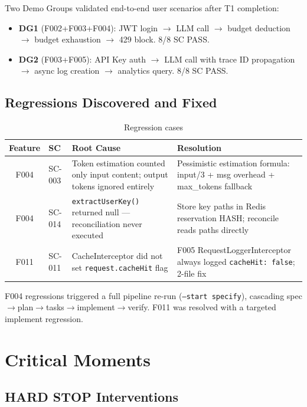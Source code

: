 \documentclass[11pt,a4paper,openright,twoside]{report}
\begin{document}
Two Demo Groups validated end-to-end user scenarios after T1 completion:

\begin{itemize}[nosep]
  \item \textbf{DG1} (F002+F003+F004): JWT login $\to$ LLM call $\to$ budget deduction $\to$ budget exhaustion $\to$ 429 block. 8/8 SC PASS.
  \item \textbf{DG2} (F003+F005): API Key auth $\to$ LLM call with trace ID propagation $\to$ async log creation $\to$ analytics query. 8/8 SC PASS.
\end{itemize}

\subsection{Regressions Discovered and Fixed}

\begin{table}[H]
\centering
\caption{Regression cases}
\label{tab:aegis-regressions}
\begin{tabularx}{\textwidth}{clXX}
\toprule
\textbf{Feature} & \textbf{SC} & \textbf{Root Cause} & \textbf{Resolution} \\
\midrule
F004 & SC-003 & Token estimation counted only input content; output tokens ignored entirely & Pessimistic estimation formula: input/3 + msg overhead + max\_tokens fallback \\
F004 & SC-014 & \texttt{extractUserKey()} returned null --- reconciliation never executed & Store key paths in Redis reservation HASH; reconcile reads paths directly \\
F011 & SC-011 & CacheInterceptor did not set \texttt{request.cacheHit} flag & F005 RequestLoggerInterceptor always logged \texttt{cacheHit:~false}; 2-file fix \\
\bottomrule
\end{tabularx}
\end{table}

F004 regressions triggered a full pipeline re-run (\texttt{--start specify}), cascading spec$\to$plan$\to$tasks$\to$implement$\to$verify. F011 was resolved with a targeted implement regression.

\section{Critical Moments}

\subsection{HARD STOP Interventions}
\end{document}
